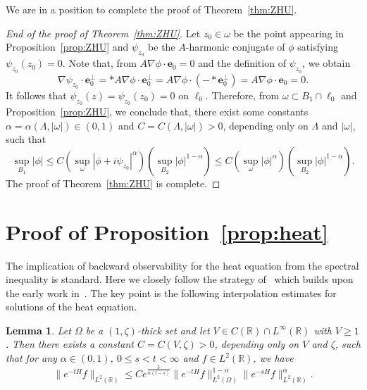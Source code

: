 \documentclass[a4paper,reqno]{amsart}
\newtheorem{lemma}[theorem]{Lemma}
\theoremstyle{definition}
\numberwithin{equation}{section}
\newcommand{\R}{\mathbb{R}}
\def \R {{\mathbb{R} }}
\begin{document}
We are in a position to complete the proof of Theorem~\ref{thm:ZHU}.

\begin{proof}[End of the proof of Theorem~\ref{thm:ZHU}]
Let $z_{0}\in\omega$ be the point appearing in Proposition~\ref{prop:ZHU} and $\psi_{z_{0}}$ be the $A$-harmonic conjugate of $\phi$ satisfying $\psi_{z_{0}}(z_{0})=0$. Note that, from $A\nabla\phi\cdot\textbf{e}_{0}=0$ and the definition of $\psi_{z_{0}}$, we obtain
\begin{equation*}
    \nabla \psi_{z_{0}} \cdot \textbf{e}_{0}^{\perp}=
   *
    A\nabla \phi \cdot \textbf{e}_{0}^{\perp}=A\nabla \phi \cdot 
   (-*
    \textbf{e}_{0}^{\perp})=A\nabla \phi\cdot {\textbf{e}_{0}}=0.
    \end{equation*}
    It follows that $\psi_{z_{0}}(z)=\psi_{z_{0}}(z_{0})=0$ on $\ell_{0}$. Therefore, from $\omega\subset B_{1}\cap \ell_{0}$ and Proposition~\ref{prop:ZHU}, we conclude that, there exist some constants $\alpha=\alpha(\Lambda,|\omega|)\in (0,1)$ and $C=C(\Lambda,|\omega|)>0$, depending only on $\Lambda$ and $|\omega|$, such that
    \begin{equation*}
        \sup_{B_{1}}|\phi|\le C\left(\sup_{\omega}|\phi+i\psi_{z_{0}}|^{\alpha}\right)\left(\sup_{B_{2}}|\phi|^{1-\alpha}\right)\le C\left(\sup_{\omega}|\phi|^{\alpha}\right)\left(\sup_{B_{2}}|\phi|^{1-\alpha}\right).    \end{equation*}
        The proof of Theorem~\ref{thm:ZHU} is complete.
\end{proof}

\section{Proof of Proposition~\ref{prop:heat}}\label{AppB}

The implication of backward observability for the heat equation from the spectral inequality is standard. Here we closely follow the strategy of~\cite[Theorem 8 and Corollary 4.1]{BurqMoyanoJEMS} which builds upon the early work in~\cite{AEWZJEMS}. The key point is the following interpolation estimates for solutions of the heat equation.

\begin{lemma}\label{le:inter}
    Let $\Omega$ be a $(1,\zeta)$-thick set and let $V\in C(\R)\cap L^{\infty}(\R)$ with $V\ge 1$. Then there exists a constant $C=C(V,\zeta)>0$, depending only on $V$ and $\zeta$, such that for any $\alpha\in (0,1)$, $0\le s<t<\infty$ and $f\in L^{2}(\R)$, we have 
    \begin{equation*}
        \|e^{-tH}f\|_{L^{2}(\R)}\le Ce^{\frac{3}{\alpha(t-s)}}\|e^{-tH}f\|_{L^{2}(\Omega)}^{1-\alpha}\|e^{-sH}f\|_{L^{2}(\R)}^{\alpha}.
    \end{equation*}
\end{lemma}
\end{document}
